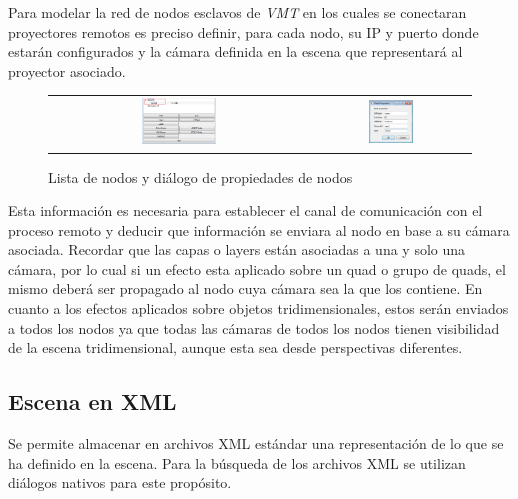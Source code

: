 Para modelar la red de nodos esclavos de \emph{VMT} en los cuales se conectaran proyectores remotos es preciso definir, para cada nodo, su IP y puerto donde estarán configurados y la cámara definida en la escena que representará al proyector asociado.

\begin{figure}
	\begin{center}
		\begin{tabular}[c]{cc}
			\includegraphics[width=0.3\textwidth]{./Cap5_vmt/vmt_nodeProperties_1.png}
				&        
			\includegraphics[width=0.3\textwidth]{./Cap5_vmt/vmt_nodeProperties_2.png}
		\end{tabular}
	\end{center}
	\caption{Lista de nodos y diálogo de propiedades de nodos}
	\label{fig:VMT-Nodes}
\end{figure}

Esta información es necesaria para establecer el canal de comunicación con el proceso remoto y deducir que información se enviara al nodo en base a su cámara asociada. Recordar que las capas o layers están asociadas a una y solo una cámara, por lo cual si un efecto esta aplicado sobre un quad o grupo de quads, el mismo deberá ser propagado al nodo cuya cámara sea la que los contiene. En cuanto a los efectos aplicados sobre objetos tridimensionales, estos serán enviados a todos los nodos ya que todas las cámaras de todos los nodos tienen visibilidad de la escena tridimensional, aunque esta sea desde perspectivas diferentes.

\subsection{Escena en XML}
Se permite almacenar en archivos XML estándar una representación de lo que se ha definido en la escena. Para la búsqueda de los archivos XML se utilizan diálogos nativos para este propósito.

